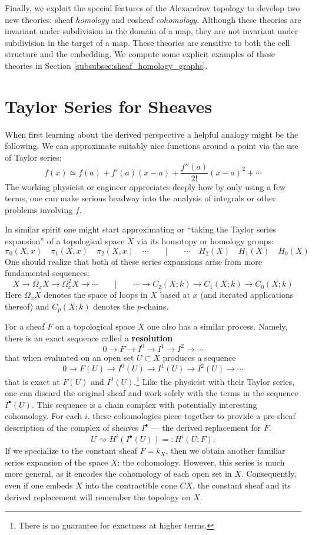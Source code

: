 Finally, we exploit the special features of the Alexandrov topology to develop two new theories: sheaf \emph{homology} and cosheaf \emph{cohomology}. Although these theories are invariant under subdivision in the domain of a map, they are not invariant under subdivision in the target of a map. These theories are sensitive to both the cell structure and the embedding. We compute some explicit examples of these theories in Section \ref{subsubsec:sheaf_homology_graphs}.

\section{Taylor Series for Sheaves}
\label{subsec:taylor}

When first learning about the derived perspective a helpful analogy might be the following. We can approximate suitably nice functions around a point via the use of Taylor series:
\[
	f(x)\simeq f(a) + f'(a)(x-a) + \frac{f''(a)}{2!}(x-a)^2+\cdots
\]  
The working physicist or engineer appreciates deeply how by only using a few terms, one can make serious headway into the analysis of integrals or other problems involving $f$.

In similar spirit one might start approximating or ``taking the Taylor series expansion'' of a topological space $X$ via its homotopy or homology groups:
\[
	\pi_0(X,x) \quad \pi_1(X,x) \quad \pi_2(X,x) \quad \cdots \qquad | \qquad \cdots \quad H_2(X) \quad H_1(X) \quad H_0(X)
\]
One should realize that both of these series expansions arise from more fundamental sequences:
\[
	X\to \Omega_x X \to \Omega_x^2 X \to \cdots\qquad | \qquad \cdots \to C_2(X;k)\to C_1(X;k) \to C_0(X;k)
\]
Here $\Omega_x X$ denotes the space of loops in $X$ based at $x$ (and iterated applications thereof) and $C_p(X;k)$ denotes the $p$-chains.

For a sheaf $F$ on a topological space $X$ one also has a similar process. Namely, there is an exact sequence called a \textbf{resolution}
\[
	0 \to F\to I^0 \to I^1 \to I^2 \to \cdots
\]
that when evaluated on an open set $U\subset X$ produces a sequence
\[
	0 \to F(U) \to I^0(U) \to I^1(U) \to I^2(U) \to \cdots
\]
that is exact at $F(U)$ and $I^0(U)$.\footnote{There is no guarantee for exactness at higher terms.} Like the physicist with their Taylor series, one can discard the original sheaf and work solely with the terms in the sequence $I^{\bullet}(U)$. This sequence is a chain complex with potentially interesting cohomology. For each $i$, these cohomologies piece together to provide a pre-sheaf description of the complex of sheaves $I^{\bullet}$ --- the derived replacement for $F$.
\[
	U \rightsquigarrow H^i(I^{\bullet}(U))=:H^i(U;F).
\]
If we specialize to the constant sheaf $F=k_X$, then we obtain another familiar series expansion of the space $X$: the cohomology. However, this series is much more general, as it encodes the cohomology of each open set in $X$. Consequently, even if one embeds $X$ into the contractible cone $CX$, the constant sheaf and its derived replacement will remember the topology on $X$.

